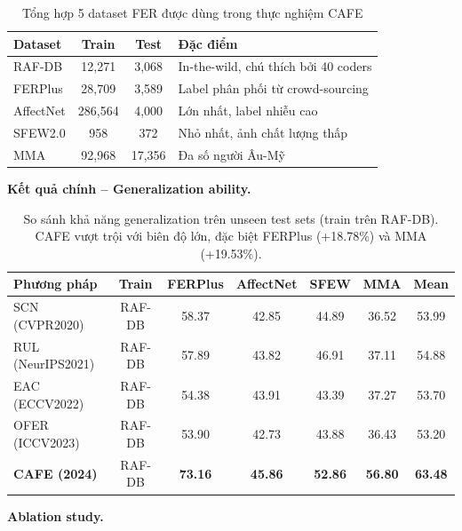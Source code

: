 \documentclass[12pt,a4paper]{article}
\let\oldtextbf\textbf
\renewcommand{\textbf}[1]{\oldtextbf{\textcolor{hcmublue}{#1}}}
\begin{document}
\begin{table}[H]
\centering
\small
\begin{tabular}{|l|c|c|l|}
\hline
\textbf{Dataset} & \textbf{Train} & \textbf{Test} & \textbf{Đặc điểm} \\ \hline
RAF-DB       & 12,271  & 3,068  & In-the-wild, chú thích bởi 40 coders \\ \hline
FERPlus      & 28,709  & 3,589  & Label phân phối từ crowd-sourcing \\ \hline
AffectNet    & 286,564 & 4,000  & Lớn nhất, label nhiễu cao \\ \hline
SFEW2.0      & 958     & 372    & Nhỏ nhất, ảnh chất lượng thấp \\ \hline
MMA          & 92,968  & 17,356 & Đa số người Âu-Mỹ \\ \hline
\end{tabular}
\caption{Tổng hợp 5 dataset FER được dùng trong thực nghiệm CAFE}
\label{tab:datasets}
\end{table}

\textbf{Kết quả chính -- Generalization ability.}

\begin{table}[H]
\centering
\small
\begin{tabular}{|l|c|c|c|c|c|c|}
\hline
\textbf{Phương pháp} & \textbf{Train} & \textbf{FERPlus} & \textbf{AffectNet} & \textbf{SFEW} & \textbf{MMA} & \textbf{Mean} \\ \hline
SCN (CVPR2020)    & RAF-DB & 58.37 & 42.85 & 44.89 & 36.52 & 53.99 \\
RUL (NeurIPS2021) & RAF-DB & 57.89 & 43.82 & 46.91 & 37.11 & 54.88 \\
EAC (ECCV2022)    & RAF-DB & 54.38 & 43.91 & 43.39 & 37.27 & 53.70 \\
OFER (ICCV2023)   & RAF-DB & 53.90 & 42.73 & 43.88 & 36.43 & 53.20 \\
\textbf{CAFE (2024)} & RAF-DB & \textbf{73.16} & \textbf{45.86} & \textbf{52.86} & \textbf{56.80} & \textbf{63.48} \\ \hline
\end{tabular}
\caption{So sánh khả năng generalization trên unseen test sets (train trên RAF-DB). CAFE vượt trội với biên độ lớn, đặc biệt FERPlus (+18.78\%) và MMA (+19.53\%).}
\label{tab:main_results}
\end{table}

\textbf{Ablation study.}
\end{document}
